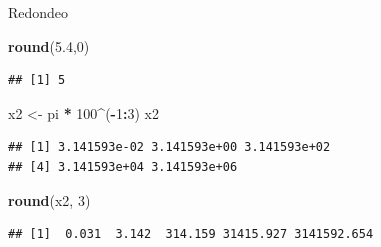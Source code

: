 \documentclass[ignorenonframetext,]{beamer}
\newenvironment{Shaded}{\begin{snugshade}}{\end{snugshade}}
\newcommand{\KeywordTok}[1]{\textcolor[rgb]{0.13,0.29,0.53}{\textbf{#1}}}
\newcommand{\DecValTok}[1]{\textcolor[rgb]{0.00,0.00,0.81}{#1}}
\newcommand{\FloatTok}[1]{\textcolor[rgb]{0.00,0.00,0.81}{#1}}
\newcommand{\StringTok}[1]{\textcolor[rgb]{0.31,0.60,0.02}{#1}}
\newcommand{\OperatorTok}[1]{\textcolor[rgb]{0.81,0.36,0.00}{\textbf{#1}}}
\newcommand{\NormalTok}[1]{#1}
\begin{document}
\begin{frame}[fragile]{Redondeo}

\begin{Shaded}
\begin{Highlighting}[]
\KeywordTok{round}\NormalTok{(}\FloatTok{5.4}\NormalTok{,}\DecValTok{0}\NormalTok{)}
\end{Highlighting}
\end{Shaded}

\begin{verbatim}
## [1] 5
\end{verbatim}

\begin{Shaded}
\begin{Highlighting}[]
\NormalTok{x2 <-}\StringTok{ }\NormalTok{pi }\OperatorTok{*}\StringTok{ }\DecValTok{100}\OperatorTok{^}\NormalTok{(}\OperatorTok{-}\DecValTok{1}\OperatorTok{:}\DecValTok{3}\NormalTok{)}
\NormalTok{x2}
\end{Highlighting}
\end{Shaded}

\begin{verbatim}
## [1] 3.141593e-02 3.141593e+00 3.141593e+02 
## [4] 3.141593e+04 3.141593e+06
\end{verbatim}

\begin{Shaded}
\begin{Highlighting}[]
\KeywordTok{round}\NormalTok{(x2, }\DecValTok{3}\NormalTok{)}
\end{Highlighting}
\end{Shaded}

\begin{verbatim}
## [1]  0.031  3.142  314.159 31415.927 3141592.654
\end{verbatim}

\end{frame}
\end{document}
